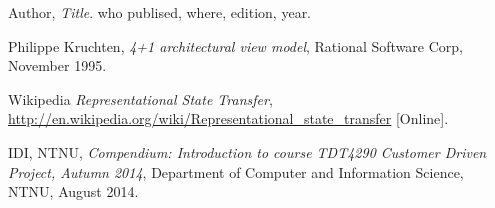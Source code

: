 \documentclass[../document]{subfiles}
\begin{document}
\begin{thebibliography}{1}
\label{Bibliography}


  Author,
  {\em Title}.
  who publised, where,
  edition,
  year.

 Philippe Kruchten, {\em 4+1 architectural view model}, Rational Software Corp, November 1995.

Wikipedia {\em Representational State Transfer}, \url{http://en.wikipedia.org/wiki/Representational_state_transfer} [Online].

 IDI, NTNU, {\em Compendium: Introduction to course TDT4290 Customer Driven Project, Autumn 2014}, Department of Computer and Information Science, NTNU,  August 2014.


\end{thebibliography}
\end{document}
